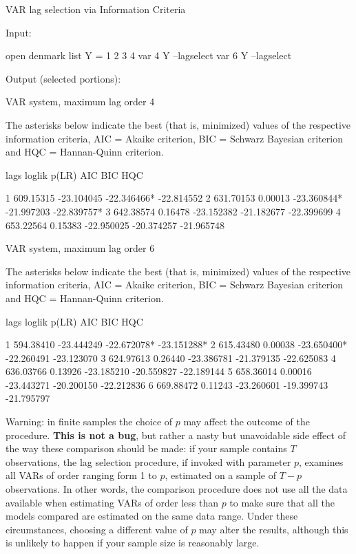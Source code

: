 \begin{script}[htbp]
  \caption{VAR lag selection via Information Criteria}
  \label{script:var-lagselect}
Input:
\begin{scodebit}
open denmark
list Y = 1 2 3 4
var 4 Y --lagselect
var 6 Y --lagselect
\end{scodebit}
Output (selected portions):
\begin{scodebit}
VAR system, maximum lag order 4

The asterisks below indicate the best (that is, minimized) values
of the respective information criteria, AIC = Akaike criterion,
BIC = Schwarz Bayesian criterion and HQC = Hannan-Quinn criterion.

lags        loglik    p(LR)       AIC          BIC          HQC

   1     609.15315           -23.104045   -22.346466*  -22.814552 
   2     631.70153  0.00013  -23.360844*  -21.997203   -22.839757*
   3     642.38574  0.16478  -23.152382   -21.182677   -22.399699 
   4     653.22564  0.15383  -22.950025   -20.374257   -21.965748 

VAR system, maximum lag order 6

The asterisks below indicate the best (that is, minimized) values
of the respective information criteria, AIC = Akaike criterion,
BIC = Schwarz Bayesian criterion and HQC = Hannan-Quinn criterion.

lags        loglik    p(LR)       AIC          BIC          HQC

   1     594.38410           -23.444249   -22.672078*  -23.151288*
   2     615.43480  0.00038  -23.650400*  -22.260491   -23.123070 
   3     624.97613  0.26440  -23.386781   -21.379135   -22.625083 
   4     636.03766  0.13926  -23.185210   -20.559827   -22.189144 
   5     658.36014  0.00016  -23.443271   -20.200150   -22.212836 
   6     669.88472  0.11243  -23.260601   -19.399743   -21.795797 
\end{scodebit}
\end{script}

Warning: in finite samples the choice of $p$ may affect the outcome of
the procedure. \textbf{This is not a bug}, but rather a nasty but
unavoidable side effect of the way these comparison should be made: if
your sample contains $T$ observations, the lag selection procedure, if
invoked with parameter $p$, examines all VARs of order ranging form 1
to $p$, estimated on a sample of $T-p$ observations. In other words,
the comparison procedure does not use all the data available when
estimating VARs of order less than $p$ to make sure that all the
models compared are estimated on the same data range. Under these
circumstances, choosing a different value of $p$ may alter the
results, although this is unlikely to happen if your sample size is
reasonably large. 

